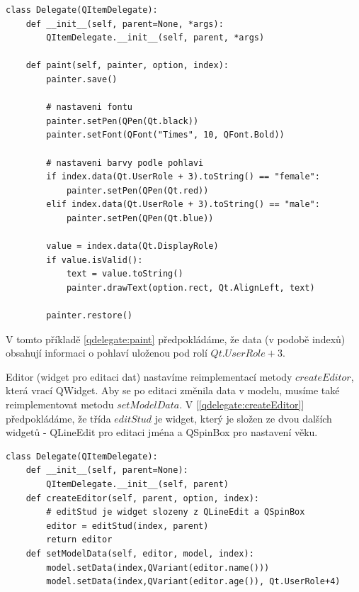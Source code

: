 \newpage
\begin{lstlisting}[label=qdelegate:paint,caption={Delegate - přepsání metody $paint$}, morekeywords={QItemDelegate, Qt, QFont, AlignLeft, DisplayRole, UserRole, QPen}]
class Delegate(QItemDelegate):
    def __init__(self, parent=None, *args):
        QItemDelegate.__init__(self, parent, *args)

    def paint(self, painter, option, index):
        painter.save()       
        
        # nastaveni fontu
        painter.setPen(QPen(Qt.black))
        painter.setFont(QFont("Times", 10, QFont.Bold))
        
		# nastaveni barvy podle pohlavi
        if index.data(Qt.UserRole + 3).toString() == "female":
            painter.setPen(QPen(Qt.red))
        elif index.data(Qt.UserRole + 3).toString() == "male":
            painter.setPen(QPen(Qt.blue))

        value = index.data(Qt.DisplayRole)
        if value.isValid():
            text = value.toString()
            painter.drawText(option.rect, Qt.AlignLeft, text)
            
        painter.restore()
\end{lstlisting}

        
\noindent V tomto příkladě \ref{qdelegate:paint} předpokládáme, že data (v podobě indexů) obsahují informaci o pohlaví uloženou pod rolí $Qt.UserRole + 3$.

Editor (widget pro editaci dat) nastavíme reimplementací metody
$createEditor$, která vrací QWidget. Aby se po editaci změnila data v
modelu, musíme také reimplementovat metodu $setModelData$. V
[\lstlistingname \ref{qdelegate:createEditor}] předpokládáme, že třída
$editStud$ je widget, který je složen ze dvou dalších widgetů -
QLineEdit pro editaci jména a QSpinBox pro nastavení věku. \\
\newpage
\begin{lstlisting}[label=qdelegate:createEditor,caption={Delegate - přepsání metod $createEditor$ a $setModelData$}, morekeywords={QItemDelegate, Qt, QFont, AlignLeft, DisplayRole, UserRole, QPen}]
class Delegate(QItemDelegate):
    def __init__(self, parent=None):
        QItemDelegate.__init__(self, parent)
    def createEditor(self, parent, option, index):
    	# editStud je widget slozeny z QLineEdit a QSpinBox
        editor = editStud(index, parent)
        return editor    
    def setModelData(self, editor, model, index):
        model.setData(index,QVariant(editor.name()))
        model.setData(index,QVariant(editor.age()), Qt.UserRole+4)
\end{lstlisting}

